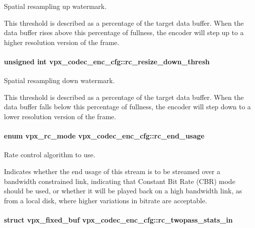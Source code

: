 \-Spatial resampling up watermark. 

\-This threshold is described as a percentage of the target data buffer. \-When the data buffer rises above this percentage of fullness, the encoder will step up to a higher resolution version of the frame. \hypertarget{structvpx__codec__enc__cfg_a1be7bd7b0eaf1e99b5e4028c37c65488}{
\paragraph[{rc\-\_\-resize\-\_\-down\-\_\-thresh}]{\setlength{\rightskip}{0pt plus 5cm}unsigned int {\bf vpx\-\_\-codec\-\_\-enc\-\_\-cfg\-::rc\-\_\-resize\-\_\-down\-\_\-thresh}}}
\label{structvpx__codec__enc__cfg_a1be7bd7b0eaf1e99b5e4028c37c65488}


\-Spatial resampling down watermark. 

\-This threshold is described as a percentage of the target data buffer. \-When the data buffer falls below this percentage of fullness, the encoder will step down to a lower resolution version of the frame. \hypertarget{structvpx__codec__enc__cfg_a99c415edb6c6f909a095a57c3430a116}{
\paragraph[{rc\-\_\-end\-\_\-usage}]{\setlength{\rightskip}{0pt plus 5cm}enum {\bf vpx\-\_\-rc\-\_\-mode} {\bf vpx\-\_\-codec\-\_\-enc\-\_\-cfg\-::rc\-\_\-end\-\_\-usage}}}
\label{structvpx__codec__enc__cfg_a99c415edb6c6f909a095a57c3430a116}


\-Rate control algorithm to use. 

\-Indicates whether the end usage of this stream is to be streamed over a bandwidth constrained link, indicating that \-Constant \-Bit \-Rate (\-C\-B\-R) mode should be used, or whether it will be played back on a high bandwidth link, as from a local disk, where higher variations in bitrate are acceptable. \hypertarget{structvpx__codec__enc__cfg_a618616a07d9d8883c544731957b56f3c}{
\paragraph[{rc\-\_\-twopass\-\_\-stats\-\_\-in}]{\setlength{\rightskip}{0pt plus 5cm}struct {\bf vpx\-\_\-fixed\-\_\-buf} {\bf vpx\-\_\-codec\-\_\-enc\-\_\-cfg\-::rc\-\_\-twopass\-\_\-stats\-\_\-in}}}
\label{structvpx__codec__enc__cfg_a618616a07d9d8883c544731957b56f3c}


